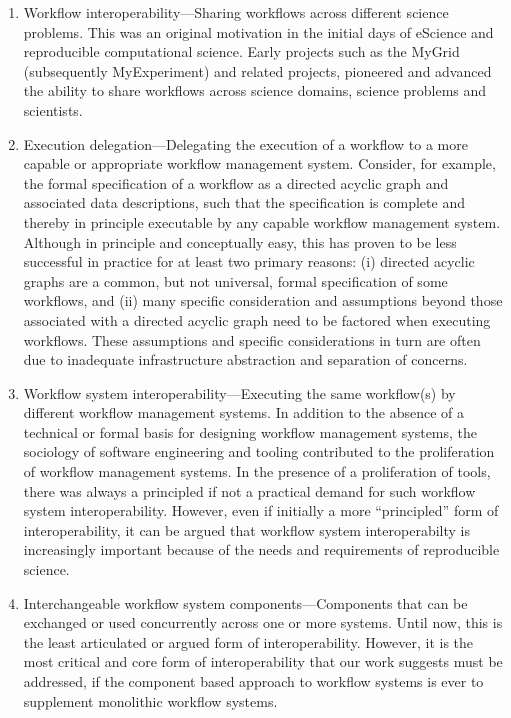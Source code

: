 \begin{enumerate}

\item Workflow interoperability---Sharing workflows across different science
problems. This was an original motivation in the initial days of eScience  and
reproducible computational science. Early projects such as the MyGrid
(subsequently MyExperiment) and related projects, pioneered and advanced the
ability to share workflows across science domains, science  problems and
scientists.

\item Execution delegation---Delegating the execution of a workflow to a more
capable or appropriate workflow management system. Consider, for example, the formal specification of a workflow as a directed acyclic graph and associated data descriptions, such that the specification is complete and thereby in principle executable by any capable workflow management system.  Although in principle and
conceptually easy, this has proven to be less successful in practice for at least
two primary reasons: (i) directed acyclic graphs are a common, but not universal, formal specification of some workflows, and (ii) many specific consideration and assumptions beyond those
associated with a directed acyclic graph need to be factored when executing workflows. These
assumptions and specific considerations in turn are often due to inadequate
infrastructure abstraction and separation of concerns. 

\item Workflow system interoperability---Executing the same workflow(s) by
different workflow management systems. In addition to the absence of a
technical or formal basis for designing workflow management systems, the
sociology of software engineering and tooling contributed to the proliferation
of workflow management systems. In the presence of a proliferation of tools,
there was always a principled if not a practical demand for such workflow
system interoperability. However, even if initially a  more  ``principled'' form
of interoperability, it can be argued that workflow system interoperabilty is
increasingly important because of the needs and requirements of reproducible
science.

\item Interchangeable workflow system components---Components that can be
exchanged or used concurrently across one or more systems. Until now, this is
the least articulated or argued form of interoperability. However, it is
the most critical and core form of interoperability that our work suggests 
must be addressed, if the component based approach to workflow systems is
ever to supplement monolithic workflow systems.

\end{enumerate} 


